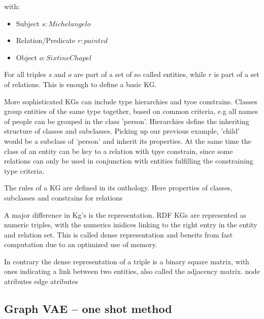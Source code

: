  with:
\begin{itemize}
    \item Subject $s:   Michelangelo$ 
    \item Relation/Predicate $r:    painted$
    \item Object $o:     Sixtine Chapel$
\end{itemize}

For all triples $s$ and $o$ are part of a set of so called entities, while $r$ is part of a set of relations. This is enough to define a basic KG.

More sophisticated KGs can include type hierarchies and tyoe constrains. Classes group entities of the same type together, based on common criteria, e.g all names of people can be grouped in the class 'person'.
Hierarchies define the inheriting structure of classes and subclasses. Picking up our previous example, 'child' would be a subclass of 'person' and inherit its properties. At the same time the class of an entity can be key to a relation with tpye constrain, since some relations can only be used in conjunction with entities fulfilling the constraining type criteria.

The rules of a KG are defined in its onthology. Here properties of classes, subclasses and constrains for relations

A major difference in Kg's is the representation. RDF KGs are represented as numeric triples, with the numerics inidices linking to the right entry in the entity and relation set. This is called dense representation and beneits from fast computation due to an optimized use of memory.

In contrary the dense representation of a triple is a binary square matrix, with ones indicating a link between two entities, also called the adjacency matrix.
node atributes 
edge atributes




\subsection{Graph VAE – one shot method}

